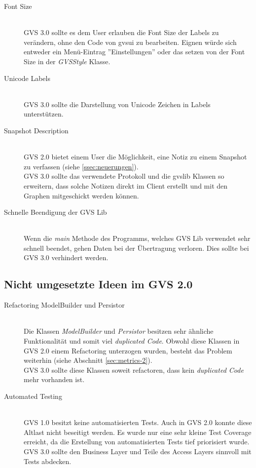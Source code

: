 \documentclass[11pt,a4paper,english,oneside]{book}
\numberwithin{equation}{chapter}
\begin{document}
	\begin{description}
		\item[Font Size] \hfill \\
			GVS 3.0 sollte es dem User erlauben die Font Size der Labels zu verändern, ohne den Code von \gls{gvsui} zu bearbeiten. Eignen würde sich entweder ein Menü-Eintrag ''Einstellungen'' oder das setzen von der Font Size in der \textit{GVSStyle} Klasse.
		\item[Unicode Labels] \hfill \\
		GVS 3.0 sollte die Darstellung von Unicode Zeichen in Labels unterstützen.
		\item[Snapshot Description] \hfill \\
			GVS 2.0 bietet einem User die Möglichkeit, eine Notiz zu einem Snapshot zu verfassen (siehe \ref{ssec:neuerungen}).\\
			GVS 3.0 sollte das verwendete Protokoll und die \gls{gvslib} Klassen so erweitern, dass solche Notizen direkt im Client erstellt und mit den Graphen mitgeschickt werden können.
		\item[Schnelle Beendigung der GVS Lib] \hfill \\
			Wenn die \textit{main} Methode des Programms, welches GVS Lib verwendet sehr schnell beendet, gehen Daten bei der Übertragung verloren. Dies sollte bei GVS 3.0 verhindert werden.
	\end{description}
	
	\subsection{Nicht umgesetzte Ideen im GVS 2.0}
	\label{ssec:gvs-todos}
	\begin{description}
		\item[Refactoring ModelBuilder und Persistor] \hfill \\
			Die Klassen \textit{ModelBuilder} und \textit{Persistor} besitzen sehr ähnliche Funktionalität und somit viel \textit{duplicated Code}. Obwohl diese Klassen in GVS 2.0 einem Refactoring unterzogen wurden, besteht das Problem weiterhin (siehe Abschnitt \ref{sec:metrics-2}).\\
			GVS 3.0 sollte diese Klassen soweit refactoren, dass kein \textit{duplicated Code} mehr vorhanden ist.
		\item[Automated Testing] \hfill \\
			GVS 1.0 besitzt keine automatisierten Tests. Auch in GVS 2.0 konnte diese Altlast nicht beseitigt werden. Es wurde nur eine sehr kleine Test Coverage erreicht, da die Erstellung von automatisierten Tests tief priorisiert wurde.\\
			GVS 3.0 sollte den Business Layer und Teile des Access Layers sinnvoll mit Tests abdecken.
	\end{description}
	
\end{document}
